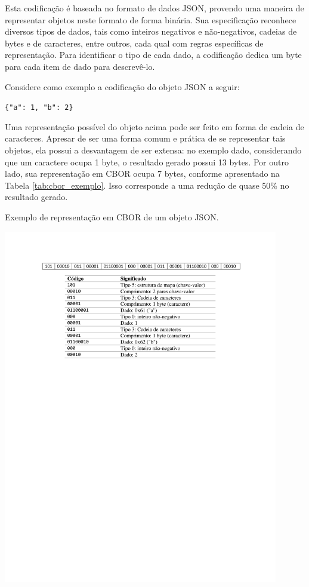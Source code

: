 Esta codificação é baseada no formato de dados JSON, provendo uma maneira de representar objetos neste formato de forma binária. Sua especificação reconhece diversos tipos de dados, tais como inteiros negativos e não-negativos, cadeias de bytes e de caracteres, entre outros, cada qual com regras específicas de representação. Para identificar o tipo de cada dado, a codificação dedica um byte para cada item de dado para descrevê-lo.

Considere como exemplo a codificação do objeto JSON a seguir:
\begin{center}
	\texttt{\{"a": 1, "b": 2\}}
\end{center}

Uma representação possível do objeto acima pode ser feito em forma de cadeia de caracteres. Apresar de ser uma forma comum e prática de se representar tais objetos, ela possui a desvantagem de ser extensa: no exemplo dado, considerando que um caractere ocupa 1 byte, o resultado gerado possui 13 bytes. Por outro lado, sua representação em CBOR ocupa 7 bytes, conforme apresentado na Tabela \ref{tab:cbor_exemplo}. Isso corresponde a uma redução de quase 50\% no resultado gerado.

\begin{table}[h]
	\centering
	\caption{Exemplo de representação em CBOR de um objeto JSON.}\smallskip
	\label{tab:cbor_exemplo}
	\includegraphics[width=0.9\textwidth]{tabelas/cbor_exemplo.pdf}
\end{table}

